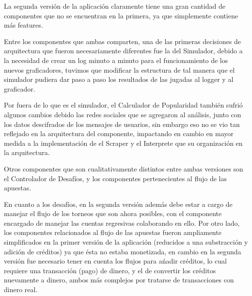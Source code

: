 La segunda versi\'on de la aplicaci\'on claramente tiene una gran cantidad de 
componentes que no se encuentran en la primera, ya que simplemente contiene m\'as
 features.

Entre los componentes que ambas comparten, una de las primeras
 decisiones de arquitectura que fueron necesariamente diferentes fue la del
Simulador, debido a la necesidad de crear un log minuto a minuto para el 
funcionamiento de los nuevos graficadores, tuvimos que modificar la estructura
de tal manera que el simulador pudiera dar paso a paso los resultados de las 
jugadas al logger y al graficador.

Por fuera de lo que es el simulador, el 
Calculador de Popularidad tambi\'en sufri\'o algunos cambios debido las redes 
sociales que se agregaron al an\'alisis, junto con los datos descifrados de los 
mensajes de usuarios, sin embargo eso no se vio tan reflejado en la 
arquitectura del componente, impactando en cambio en mayor medida a la 
implementaci\'on de el Scraper y el Interprete que su organizaci\'on 
en la arquitectura.



Otros componentes que son cualitativamente distintos entre ambas versiones son 
el Controlador de Desaf\'ios, y los componentes pertenecientes al flujo de las 
apuestas.

En cuanto a los desaf\'ios, en la segunda versi\'on adem\'as debe estar a 
cargo de manejar el flujo de los torneos que son ahora posibles, con el 
componente encargado de manejar las cuentas regresivas colaborando en ello. Por 
otro lado, los componentes relacionados al flujo de las apuestas fueron 
ampliamente simplificados en la primer versi\'on de la aplicaci\'on (reducidos a una
 substracci\'on y adici\'on de cr\'editos) ya que \'esta no estaba monetizada, en cambio
 en la segunda versi\'on fue necesario tener en cuenta los flujos para a\'nadir 
cr\'editos, lo cual requiere una transacci\'on (pago) de dinero, y el de convertir 
los cr\'editos nuevamente a dinero, ambos m\'as complejos por tratarse de 
transacciones con dinero real.
